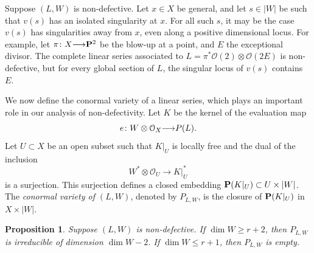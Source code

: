 \documentclass[11pt,reqno]{amsart}
\theoremstyle{plain}
\newtheorem{proposition}[theorem]{Proposition}
\theoremstyle{definition}
\theoremstyle{remark}
\numberwithin{equation}{section}
\renewcommand{\to}{{\longrightarrow}}
\numberwithin{equation}{section}
\renewcommand{\O}{\mathcal O}
\begin{document}
\begin{remark}
  Suppose $(L, W)$ is non-defective.
  Let $x \in X$ be general, and let $s \in |W|$ be such that $v(s)$ has an isolated singularity at $x$.
  For all such $s$, it may be the case $v(s)$ has singularities away from $x$, even along a positive dimensional locus.
  For example, let $\pi \from X \to \P^2$  be the blow-up at a point, and $E$ the exceptional divisor.
  The complete linear series associated to $L = \pi^* \O(2) \otimes \O(2E)$ is non-defective, but for every global section of $L$, the singular locus of $v(s)$ contains $E$.
\end{remark}


We now define the conormal variety of a linear series, which plays an important role in our analysis of non-defectivity.
Let $K$ be the kernel of the evaluation map
\[ e \from W \otimes \O_X \to P(L).\]
Let $U \subset X$ be an open subset such that $K|_U$ is locally free and the dual of the inclusion 
\[W^* \otimes \O_U \to K|_U^*\]
is a surjection.
This surjection defines a closed embedding $\P(K|_U) \subset U \times |W|$.
The \emph{conormal variety of $(L,W)$}, denoted by $P_{L,W}$, is the closure of $\P(K|_U)$ in $X \times |W|$.

\begin{proposition}\label{prop:dimension}
  \label{prop:dimP}
  Suppose $(L, W)$ is non-defective.
  If $\dim W \geq r+2$, then $P_{L,W}$ is irreducible of dimension $\dim W - 2$.
  If $\dim W \leq r+1$, then $P_{L,W}$ is empty.
\end{proposition} 
\end{document}
